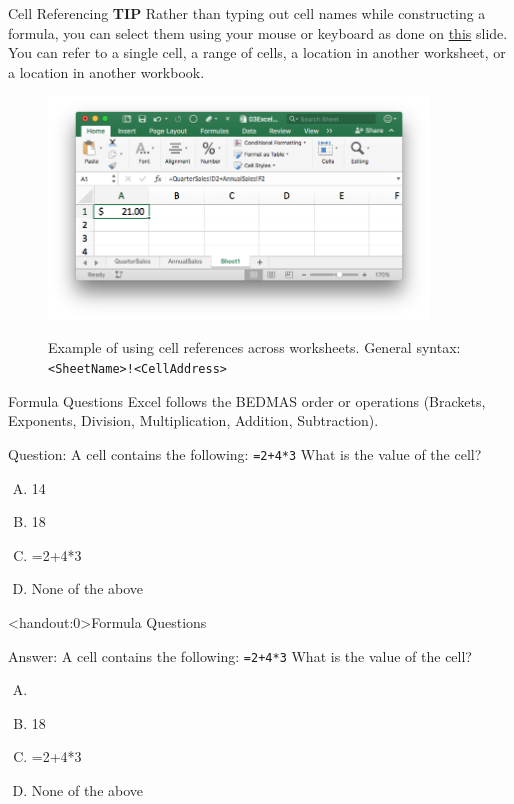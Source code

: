 \documentclass[xcolor=svgnames]{beamer}
\begin{document}
\begin{frame}{Cell Referencing}{}
{\bf TIP} Rather than typing out cell names while constructing a formula, you can select them using your mouse or keyboard as done on  \hyperlink{selectingcells}{this} slide.
You can refer to a single cell, a range of cells, a location in another worksheet, or a location in another workbook.
\begin{figure}[htbp]
\begin{center}
\caption{Example of using cell references across worksheets. General syntax: {\tt <SheetName>!<CellAddress>}}
\vspace{-1em}
\includegraphics[width=0.9\textwidth]{img/cellref}
\label{default}
\end{center}
\end{figure}
\end{frame}

\begin{frame}{Formula Questions}
Excel follows the BEDMAS order or operations (Brackets, Exponents, Division, Multiplication, Addition, Subtraction). %
\begin{example}
{Question:} A cell contains the following: {\tt=2+4*3}  What is the value of the cell?
\begin{enumerate}[A)]
\item 14
\item 18
\item =2+4*3
\item None of the above
\end{enumerate}
\end{example}
\end{frame}

\begin{frame}<handout:0>{Formula Questions}
\begin{block}
{Answer:} A cell contains the following: {\tt=2+4*3}  What is the value of the cell?
\begin{enumerate}[A)]
\item \textbf<1>{\textit<1>{{}}}
\item 18
\item =2+4*3
\item None of the above
\end{enumerate}
\end{block}
\end{frame}
\end{document}
